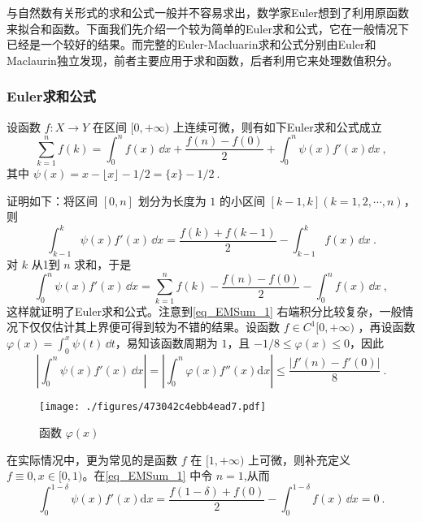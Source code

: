 
与自然数有关形式的求和公式一般并不容易求出，数学家Euler想到了利用原函数来拟合和函数。下面我们先介绍一个较为简单的Euler求和公式，它在一般情况下已经是一个较好的结果。而完整的Euler-Macluarin求和公式分别由Euler和Maclaurin独立发现，前者主要应用于求和函数，后者利用它来处理数值积分。

\subsubsection{Euler求和公式}

\begin{theorem}{}
设函数 $f:X\to Y$ 在区间 $[0,+\infty)$ 上连续可微，则有如下Euler求和公式成立	
        \begin{equation}\label{eq_EMSum_1} 
            \sum_{k=1}^{n}f(k)=\int_{0}^{n}f(x)\,\dd x
            +\frac{f(n)-f(0)}{2}+\int_{0}^{n}\psi(x)f'(x)\dd x~,
        \end{equation}
    其中 $\psi(x)=x-\lfloor x \rfloor-1/2=\{x\}-1/2~.$
\end{theorem}
证明如下：将区间 $[0,n]$ 划分为长度为 $1$ 的小区间 $[k-1,k](k=1,2,\cdots,n)$，则
​\[
    \int_{k-1}^{k}\psi(x)f'(x)\,\dd x
    =\frac{f(k)+f(k-1)}{2}-\int_{k-1}^{k}f(x)\,\dd x~.
\]
​对 $k$ 从1到 $n$ 求和，于是
​\[
    \int_{0}^{n}\psi(x)f'(x)\,\dd x
    =\sum_{k=1}^{n}f(k)-\frac{f(n)-f(0)}{2}-\int_{0}^{n}f(x)\,\dd x~,
\]
这样就证明了Euler求和公式。注意到\autoref{eq_EMSum_1}  右端积分比较复杂，一般情况下仅仅估计其上界便可得到较为不错的结果。设函数 $f\in{C^1[0,+\infty)}$ ，再设函数 $\varphi(x)=\displaystyle{\int_{0}^{x}\psi(t)\,\dd t}$，易知该函数周期为 $1$，且
 $-1/8\leqslant\varphi(x)\leqslant 0$，因此
\[
    \left|\int_{0}^{n}\psi(x)f'(x)\,\dd x\right|
    =\left|\int_{0}^{n}\varphi(x)f''(x)\mathrm{d}x\right|
    \leqslant\frac{|f'(n)-f'(0)|}{8}~.
\]
\begin{figure}[ht]
\centering
\texttt{[image: ./figures/473042c4ebb4ead7.pdf]}
\caption{函数 $\varphi(x)$} \label{fig_EMSum_1}
\end{figure}
在实际情况中，更为常见的是函数 $f$ 在 $[1,+\infty)$ 上可微，则补充定义 $ f\equiv 0,x\in[0,1)$。在\autoref{eq_EMSum_1}  中令 $n=1$,从而
\[
    \int_{0}^{1-\delta}\psi(x)f'(x)\mathrm{d}x
    =\frac{f(1-\delta)+f(0)}{2}-\int_{0}^{1-\delta}f(x)\,\dd x=0~.
\]
